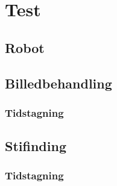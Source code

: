\chapter{Test}

\section{Robot}
\section{Billedbehandling}
\subsection{Tidstagning}
\section{Stifinding}
\subsection{Tidstagning}